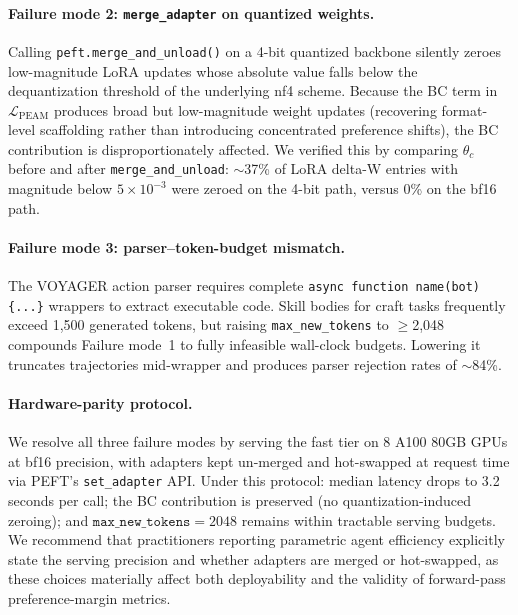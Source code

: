 \documentclass[11pt]{article}
\begin{document}
\paragraph{Failure mode 2: \texttt{merge\_adapter} on
quantized weights.} Calling
\texttt{peft.merge\_and\_unload()} on a 4-bit quantized
backbone silently zeroes low-magnitude LoRA updates whose
absolute value falls below the dequantization threshold of
the underlying nf4 scheme. Because the BC term in
$\mathcal{L}_{\text{PEAM}}$ produces broad but low-magnitude
weight updates (recovering format-level scaffolding rather
than introducing concentrated preference shifts), the BC
contribution is disproportionately affected. We verified
this by comparing $\theta_c$ before and after
\texttt{merge\_and\_unload}: $\sim$37\% of LoRA delta-W   %
entries with magnitude below $5 \times 10^{-3}$ were
zeroed on the 4-bit path, versus 0\% on the bf16 path.   %

\paragraph{Failure mode 3: parser--token-budget mismatch.}
The VOYAGER action parser requires complete
\texttt{async function name(bot)\{...\}} wrappers to extract
executable code. Skill bodies for craft tasks frequently
exceed 1{,}500 generated tokens, but raising
\texttt{max\_new\_tokens} to $\geq$2{,}048 compounds Failure
mode~1 to fully infeasible wall-clock budgets. Lowering it
truncates trajectories mid-wrapper and produces parser
rejection rates of $\sim$84\%.                            %

\paragraph{Hardware-parity protocol.} We resolve all three
failure modes by serving the fast tier on 8 A100 80GB
GPUs at bf16 precision, with adapters kept un-merged and
hot-swapped at request time via PEFT's
\texttt{set\_adapter} API. Under this protocol:
median latency drops to 3.2 seconds per call;             %
the BC contribution is preserved (no quantization-induced
zeroing); and $\texttt{max\_new\_tokens} = 2048$ remains
within tractable serving budgets. We recommend that
practitioners reporting parametric agent efficiency
explicitly state the serving precision and whether adapters
are merged or hot-swapped, as these choices materially
affect both deployability and the validity of forward-pass
preference-margin metrics.
\end{document}
